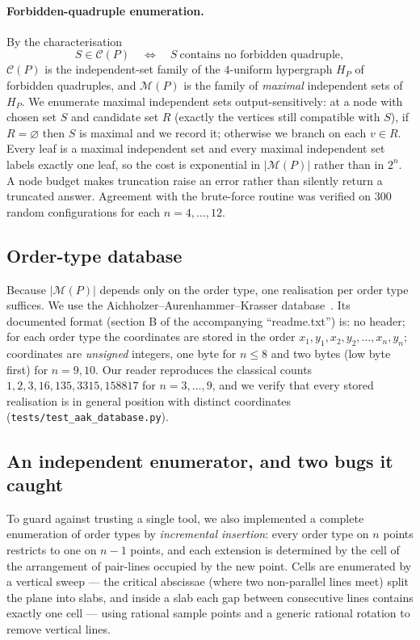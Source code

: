 \documentclass[11pt,a4paper]{article}
\theoremstyle{definition}
\newcommand{\M}{\mathcal{M}}
\newcommand{\CP}{\mathcal{C}}
\begin{document}
\paragraph{Forbidden-quadruple enumeration.} By the characterisation
\[
  S\in\CP(P)\quad\Longleftrightarrow\quad S\ \text{contains no forbidden quadruple},
\]
$\CP(P)$ is the independent-set family of the $4$-uniform hypergraph $H_P$ of
forbidden quadruples, and $\M(P)$ is the family of \emph{maximal} independent sets
of $H_P$.  We enumerate maximal independent sets output-sensitively: at a node
with chosen set $S$ and candidate set $R$ (exactly the vertices still compatible
with $S$), if $R=\varnothing$ then $S$ is maximal and we record it; otherwise we
branch on each $v\in R$.  Every leaf is a maximal independent set and every
maximal independent set labels exactly one leaf, so the cost is exponential in
$|\M(P)|$ rather than in $2^n$.  A node budget makes truncation raise an error
rather than silently return a truncated answer.  Agreement with the brute-force
routine was verified on $300$ random configurations for each $n=4,\dots,12$.

\subsection{Order-type database}

Because $|\M(P)|$ depends only on the order type, one realisation per order type
suffices.  We use the Aichholzer--Aurenhammer--Krasser
database~\cite{aak2002,aak2001,aak2007}.  Its documented format (section B of the
accompanying ``readme.txt'') is: no header; for each order type the coordinates are
stored in the order $x_1,y_1,x_2,y_2,\dots,x_n,y_n$; coordinates are
\emph{unsigned} integers, one byte for $n\le 8$ and two bytes (low byte first) for
$n=9,10$.  Our reader reproduces the classical counts
$1,2,3,16,135,3315,158817$ for $n=3,\dots,9$, and we verify that every stored
realisation is in general position with distinct coordinates
(\texttt{tests/test\_aak\_database.py}).

\subsection{An independent enumerator, and two bugs it caught}
\label{sec:bugs}

To guard against trusting a single tool, we also implemented a complete
enumeration of order types by \emph{incremental insertion}: every order type on $n$
points restricts to one on $n-1$ points, and each extension is determined by the
cell of the arrangement of pair-lines occupied by the new point.  Cells are
enumerated by a vertical sweep --- the critical abscissae (where two non-parallel
lines meet) split the plane into slabs, and inside a slab each gap between
consecutive lines contains exactly one cell --- using rational sample points and a
generic rational rotation to remove vertical lines.
\end{document}
